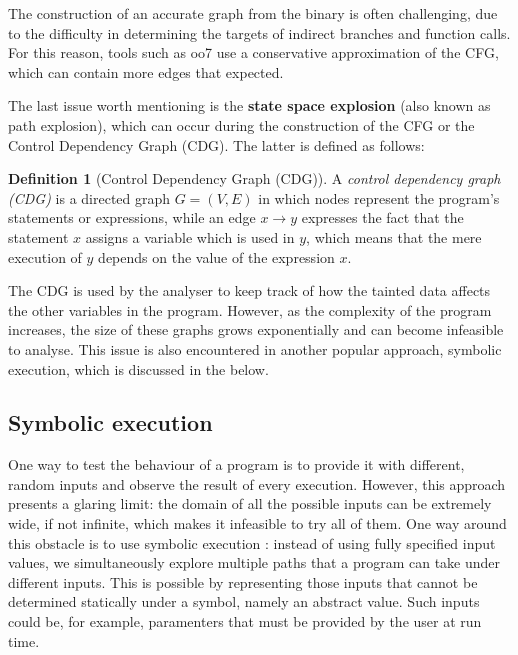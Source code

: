 \documentclass[12pt,a4paper]{book}
\theoremstyle{definition}
\newtheorem{defn}{Definition}
\begin{document}
	The construction of an accurate graph from the binary is often challenging, due to the difficulty in determining the targets of indirect branches and function calls. For this reason, tools such as oo7 \cite{Wang2019} use a conservative approximation of the CFG, which can contain more edges that expected.
	
	The last issue worth mentioning is the \textbf{state space explosion} (also known as path explosion), which can occur during the construction of the CFG or the Control Dependency Graph (CDG). The latter is defined as follows:
	
	\begin{defn}[Control Dependency Graph (CDG)]
		A \textit{control dependency graph (CDG)} \cite{Krinke2007} is a directed graph $G=(V,E)$ in which nodes represent the program's statements or expressions, while an edge $x\rightarrow y$ expresses the fact that the statement $x$ assigns a variable which is used in $y$, which means that the mere execution of $y$ depends on the value of the expression $x$. 
	\end{defn}
	The CDG is used by the analyser to keep track of how the tainted data affects the other variables in the program. However, as the complexity of the program increases, the size of these graphs grows exponentially and can become infeasible to analyse. This issue is also encountered in another popular approach, symbolic execution, which is discussed in the below. 
	\subsection{Symbolic execution}\label{sec:symbolic-exec}
	One way to test the behaviour of a program is to provide it with different, random inputs and observe the result of every execution. However, this approach presents a glaring limit: the domain of all the possible inputs can be extremely wide, if not infinite, which makes it infeasible to try all of them. One way around this obstacle is to use symbolic execution \cite{Baldoni2018} \cite{King76}: instead of using fully specified input values, we simultaneously explore multiple paths that a program can take under different inputs. This is possible by representing those inputs that cannot be determined statically under a symbol, namely an abstract value. Such inputs could be, for example, paramenters that must be provided by the user at run time.
	
\end{document}
